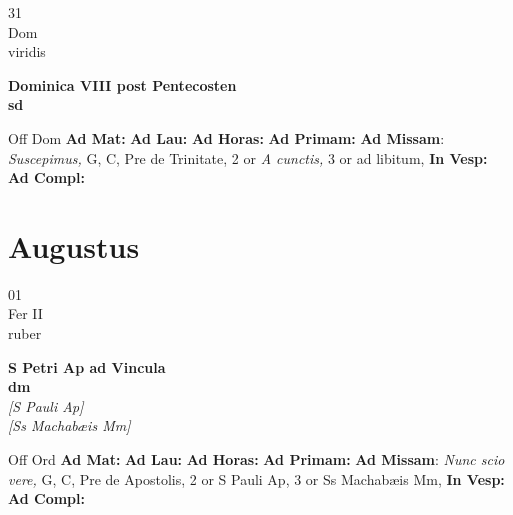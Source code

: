 \documentclass[10pt, openany]{book}
\begin{document}
    \begin{center}
        \begin{minipage}{3.5in}
            \vspace{2em}
            \begin{minipage}{0.5in}
                {\Huge 31} \\
                {\normalsize Dom} \\
                {\normalsize viridis}
            \end{minipage}
            \begin{minipage}{3.0in}
                \textbf{ \large Dominica VIII post Pentecosten \\
                \textnormal{\normalsize sd}} \\ 
            \end{minipage}
            \begin{justify}Off Dom
                \textbf{Ad Mat: }
                \textbf{Ad Lau: }
                \textbf{Ad Horas: }
                \textbf{Ad Primam: }\textbf{Ad Missam}: \textit{Suscepimus,} G, C, Pre de Trinitate, 2 or \textit{A cunctis,} 3 or ad libitum,  
                \textbf{In Vesp: }
                \textbf{Ad Compl: }
            \end{justify}
        \end{minipage}
    \end{center}

    \chapter{Augustus}
                    
    \begin{center}
        \begin{minipage}{3.5in}
            \vspace{2em}
            \begin{minipage}{0.5in}
                {\Huge 01} \\
                {\normalsize Fer II} \\
                {\normalsize ruber}
            \end{minipage}
            \begin{minipage}{3.0in}
                \textbf{ \large S Petri Ap ad Vincula \\
                \textnormal{\normalsize dm}} \\ \textit{[S Pauli Ap]} \\ \textit{[Ss Machabæis Mm]} \\ 
            \end{minipage}
            \begin{justify}Off Ord
                \textbf{Ad Mat: }
                \textbf{Ad Lau: }
                \textbf{Ad Horas: }
                \textbf{Ad Primam: }\textbf{Ad Missam}: \textit{Nunc scio vere,} G, C, Pre de Apostolis, 2 or S Pauli Ap, 3 or Ss Machabæis Mm,  
                \textbf{In Vesp: }
                \textbf{Ad Compl: }
            \end{justify}
        \end{minipage}
    \end{center}
\end{document}
